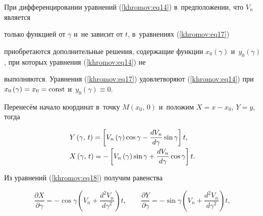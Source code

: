 При дифференцировании уравнений (\ref{khromov:eq14}) в~предположении, что $V_n $ является 

только функцией от $\gamma $ и~не зависит от $t$, в~уравнениях (\ref{khromov:eq17}) 

приобретаются дополнительные решения, содержащие функции $x_0 \left( \gamma 

\right)$ и~$y_0 \left( \gamma \right)$, при которых уравнения (\ref{khromov:eq14}) не 

выполняются. Уравнения (\ref{khromov:eq17}) удовлетворяют (\ref{khromov:eq14}) при $x_0 \left( \gamma 

\right) = x_0 = \rm const$ и~$y_0 \left( \gamma \right) \equiv 0$. 



Перенесём начало координат в~точку $M\left( {x_0,\, 0} \right)$ и~положим $X = x - x_0 $, $Y = y$, тогда

\begin{equation}

\label{khromov:eq18}

\begin{array}{l}

\displaystyle

 Y\left( {\gamma ,\,t} \right) = \left[ {V_n \left( \gamma \right)\cos \gamma 

- \frac{dV_n }{d\gamma }\sin \gamma } \right]t, \vspace{1mm}\\ 

\displaystyle

 X\left( {\gamma ,\,t} \right) = - \left[ {V_n \left( \gamma \right)\sin 

\gamma + \frac{dV_n }{d\gamma }\cos \gamma } \right]t. 

 \end{array}

\end{equation}



Из уравнений (\ref{khromov:eq18}) получим равенства

\begin{equation}

\label{khromov:eq19}

\frac{\partial X}{\partial \gamma } = - \cos \gamma \left( {V_n + 

\frac{d^2V_n }{d\gamma ^2}} \right)t,\qquad \frac{\partial Y}{\partial 

\gamma } = - \sin \gamma \left( {V_n + \frac{d^2V_n }{d\gamma ^2}} 

\right)t,

\end{equation}

